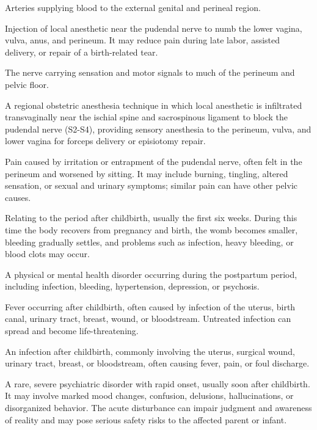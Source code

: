  Arteries supplying blood to the external genital and perineal region.

 Injection of local anesthetic near the pudendal nerve to numb the lower vagina, vulva, anus, and perineum. It may reduce pain during late labor, assisted delivery, or repair of a birth-related tear.

 The nerve carrying sensation and motor signals to much of the perineum and pelvic floor.

 A regional obstetric anesthesia technique in which local anesthetic is infiltrated transvaginally near the ischial spine and sacrospinous ligament to block the pudendal nerve (S2-S4), providing sensory anesthesia to the perineum, vulva, and lower vagina for forceps delivery or episiotomy repair.

 Pain caused by irritation or entrapment of the pudendal nerve, often felt in the perineum and worsened by sitting. It may include burning, tingling, altered sensation, or sexual and urinary symptoms; similar pain can have other pelvic causes.

 Relating to the period after childbirth, usually the first six weeks. During this time the body recovers from pregnancy and birth, the womb becomes smaller, bleeding gradually settles, and problems such as infection, heavy bleeding, or blood clots may occur.

 A physical or mental health disorder occurring during the postpartum period, including infection, bleeding, hypertension, depression, or psychosis.

 Fever occurring after childbirth, often caused by infection of the uterus, birth canal, urinary tract, breast, wound, or bloodstream. Untreated infection can spread and become life-threatening.

 An infection after childbirth, commonly involving the uterus, surgical wound, urinary tract, breast, or bloodstream, often causing fever, pain, or foul discharge.

 A rare, severe psychiatric disorder with rapid onset, usually soon after childbirth.
It may involve marked mood changes, confusion, delusions, hallucinations, or disorganized behavior.
The acute disturbance can impair judgment and awareness of reality and may pose serious safety risks
to the affected parent or infant.

